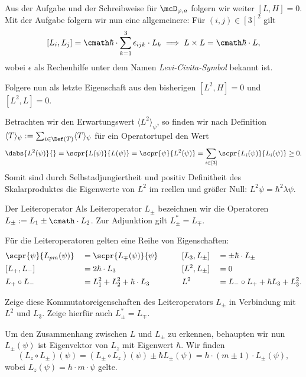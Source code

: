 \documentclass{subfiles}
\begin{document}
        Aus der Aufgabe und der Schreibweise für $\mcD_{\varphi,a}$ folgern wir weiter $[L,H] = 0$. 
        Mit der Aufgabe folgern wir nun eine allgemeinere: Für $(i,j)\in[3]^2$ gilt
        \[
            [L_i,L_j] = \cmath\hbar\cdot \sum_{k=1}^3\epsilon_{ijk}\cdot L_k \implies L\times L = \cmath\hbar\cdot L,
        \]
        wobei $\epsilon$ als Rechenhilfe unter dem Namen \textit{Levi-Civita-Symbol} bekannt ist. 
        \begin{Aufgabe}
            \nr{} Folgere nun als letzte Eigenschaft aus den bisherigen $[L^2,H] = 0$ und $[L^2,L] = 0$.
        \end{Aufgabe}
        Betrachten wir den Erwartungswert $\langle L^2\rangle_\psi$, so finden wir nach Definition $\langle T\rangle_\psi := \sum_{i\in\Def(T)}\langle T\rangle_\psi$ für ein Operatortupel den Wert
        \[
            \dabs{L^2(\psi)}{} = \scpr{L(\psi)}{L(\psi)} = \scpr{\psi}{L^2(\psi)} = \sum_{i\in[3]}\scpr{L_i(\psi)}{L_i(\psi)}\geq 0.
        \]
        Somit sind durch Selbstadjungiertheit und positiv Definitheit des Skalarproduktes die Eigenwerte von $L^2$ im reellen und größer Null: $L^2\psi = \hbar^2\lambda\psi$. 
        \begin{mdef}{Der Leiteroperator}
            Als Leiteroperator $L_\pm$ bezeichnen wir die Operatoren $L_\pm := L_1\pm\cmath\cdot L_2$. Zur Adjunktion gilt $L_\pm^* = L_\mp$.
        \end{mdef}
        \noindent Für die Leiteroperatoren gelten eine Reihe von Eigenschaften:
        \begin{alignat*}{4}
            &\scpr{\psi}{L_{pm}(\psi)} &&= \scpr{L_\mp(\psi)}{\psi} &&\qquad [L_3,L_\pm] &&= \pm\hbar\cdot L_\pm\\
            &[L_+,L_-] &&= 2\hbar\cdot L_3 &&\qquad [L^2,L_\pm] &&= 0\\
            &L_+\circ L_- &&= L_1^2 + L_2^2 + \hbar\cdot L_3 &&\qquad L^2 &&= L_-\circ L_+ + \hbar L_3 + L_3^2.
        \end{alignat*}
        
        \begin{Aufgabe}
            \nr{} Zeige diese Kommutatoreigenschaften des Leiteroperators $L_\pm$ in Verbindung mit $L^2$ und $L_3$. Zeige hierfür auch $L_\pm^* = L_\mp$. 
        \end{Aufgabe}
        Um den Zusammenhang zwischen $L$ und $L_\pm$ zu erkennen, behaupten wir nun $L_\pm(\psi)$ ist Eigenvektor von $L_z$ mit Eigenwert $\hbar$. Wir finden
        \[(L_z\circ L_\pm)(\psi) = (L_\pm\circ L_z)(\psi) \pm\hbar L_\pm(\psi) = h\cdot (m\pm 1)\cdot L_\pm(\psi),\]
        wobei $L_z(\psi) = h\cdot m\cdot \psi$ gelte. 
\end{document}
